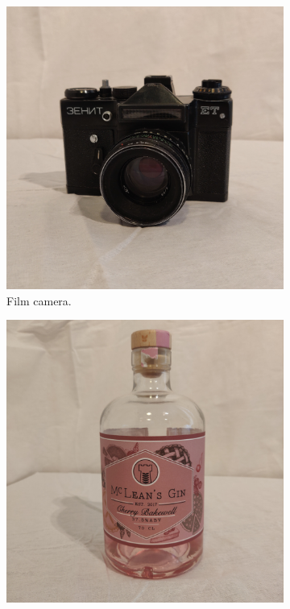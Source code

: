 \documentclass{l4proj}
\begin{document}
\begin{figure}[H]
\medskip
\begin{subfigure}{0.20\textwidth}
  \includegraphics[width=\linewidth]{l4template-master/images/camera.png}
  \caption{Film camera.}
  \label{fig:4}
\end{subfigure}\hfil %
\begin{subfigure}{0.20\textwidth}
  \includegraphics[width=\linewidth]{l4template-master/images/gin.png}

\end{subfigure}
\end{figure}
\end{document}
